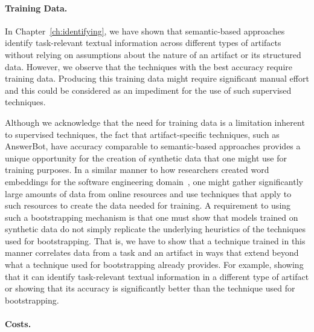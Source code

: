 \paragraph{\textbf{Training Data.}}


In Chapter~\ref{ch:identifying}, we have shown that semantic-based approaches identify task-relevant textual information across
different types of artifacts without relying on
assumptions about the nature of an artifact or its structured data.
However, we
observe that the techniques with the best accuracy require training data. Producing this
training data might require significant manual effort and this could be considered as an impediment for the use of such supervised techniques. %



Although we acknowledge that the need for training data is a limitation inherent to supervised techniques,
the fact that artifact-specific techniques, such as AnswerBot, have accuracy comparable to semantic-based approaches
 provides
a unique opportunity for the creation of synthetic data that one might use for training purposes.
In a similar manner to how researchers created word embeddings for the software engineering domain~\cite{Efstathiou2018}, one might gather significantly large amounts of data from online resources
and use techniques that apply to such resources to create the data needed for training.
A requirement to using such a bootstrapping mechanism is that one must show that models trained on synthetic data do not simply replicate the underlying heuristics of the techniques used for bootstrapping. That is, we have to show that a technique trained
in this manner correlates data from a task and an artifact in ways that
extend beyond what a technique used for bootstrapping already provides. For example, showing that
it can identify task-relevant textual information in a different type of artifact or showing
that its accuracy is significantly better than the technique used for bootstrapping.



\paragraph{\textbf{Costs.}}


